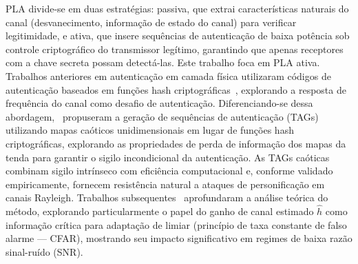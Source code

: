 \documentclass{sbrt}
\begin{document}
PLA divide-se em duas estratégias: passiva, que extrai características naturais do canal (desvanecimento, informação de estado do canal) para verificar legitimidade, e ativa, que insere sequências de autenticação de baixa potência sob controle criptográfico do transmissor legítimo, garantindo que apenas receptores com a chave secreta possam detectá-las. Este trabalho foca em PLA ativa. Trabalhos anteriores em autenticação em camada física utilizaram códigos de autenticação baseados em funções hash criptográficas~\cite{ref_hash_pla, ref_ldpc_auth}, explorando a resposta de frequência do canal como desafio de autenticação. Diferenciando-se dessa abordagem,~\cite{ref_joao} propuseram a geração de sequências de autenticação (TAGs) utilizando mapas caóticos unidimensionais em lugar de funções hash criptográficas, explorando as propriedades de perda de informação dos mapas da tenda para garantir o sigilo incondicional da autenticação. As TAGs caóticas combinam sigilo intrínseco com eficiência computacional e, conforme validado empiricamente, fornecem resistência natural a ataques de personificação em canais Rayleigh. Trabalhos subsequentes~\cite{ref_xie} aprofundaram a análise teórica do método, explorando particularmente o papel do ganho de canal estimado $\hat{h}$ como informação crítica para adaptação de limiar (princípio de taxa constante de falso alarme --- CFAR), mostrando seu impacto significativo em regimes de baixa razão sinal-ruído (SNR).
\end{document}
